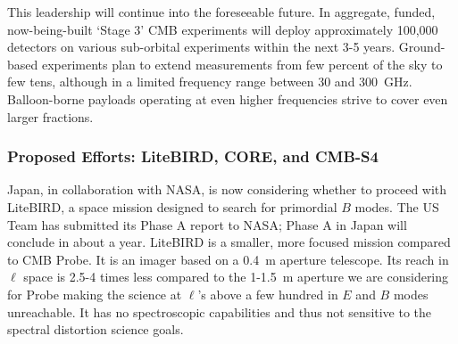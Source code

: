 This leadership will continue into the foreseeable future. In aggregate, funded, now-being-built 
`Stage 3' CMB experiments will deploy approximately 100,000 detectors on various sub-orbital 
experiments within the next 3-5 years. 
Ground-based experiments plan to extend measurements from few percent of the sky to 
few tens, although in a limited frequency range between 30 and 300~GHz. Balloon-borne 
payloads operating at even higher frequencies strive to cover even larger fractions.  



\vspace{-0.18in}

\subsubsection{Proposed Efforts: LiteBIRD, CORE, and CMB-S4} 

\vspace{-0.05in}

Japan, in collaboration with NASA, is now considering whether to proceed with LiteBIRD, a space mission 
designed to search for primordial $B$ modes. The US Team has submitted its Phase A report to NASA; Phase A 
in Japan will conclude in about a year. LiteBIRD is a smaller, more focused
mission compared to CMB Probe. It is an imager based on a 0.4~m aperture 
telescope. Its reach in $\ell$ space is 2.5-4 times less compared to the 1-1.5~m aperture 
we are considering for Probe making the science at $\ell$'s above a 
few hundred in $E$ and $B$ modes unreachable. 
It has no spectroscopic capabilities and thus not sensitive to the spectral distortion science goals. 

